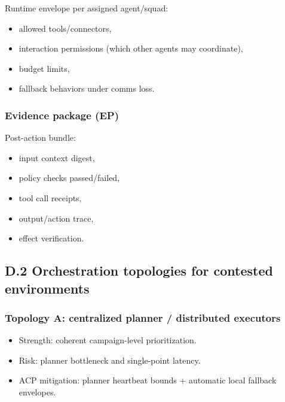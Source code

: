 \documentclass[
]{article}
\providecommand{\tightlist}{%
  \setlength{\itemsep}{0pt}\setlength{\parskip}{0pt}}
\begin{document}
Runtime envelope per assigned agent/squad:

\begin{itemize}
\tightlist
\item
  allowed tools/connectors,
\item
  interaction permissions (which other agents may coordinate),
\item
  budget limits,
\item
  fallback behaviors under comms loss.
\end{itemize}

\hypertarget{evidence-package-ep}{%
\subsubsection{Evidence package (EP)}\label{evidence-package-ep}}

Post-action bundle:

\begin{itemize}
\tightlist
\item
  input context digest,
\item
  policy checks passed/failed,
\item
  tool call receipts,
\item
  output/action trace,
\item
  effect verification.
\end{itemize}

\hypertarget{d.2-orchestration-topologies-for-contested-environments}{%
\subsection{D.2 Orchestration topologies for contested
environments}\label{d.2-orchestration-topologies-for-contested-environments}}

\hypertarget{topology-a-centralized-planner-distributed-executors}{%
\subsubsection{Topology A: centralized planner / distributed
executors}\label{topology-a-centralized-planner-distributed-executors}}

\begin{itemize}
\tightlist
\item
  Strength: coherent campaign-level prioritization.
\item
  Risk: planner bottleneck and single-point latency.
\item
  ACP mitigation: planner heartbeat bounds + automatic local fallback
  envelopes.
\end{itemize}
\end{document}
